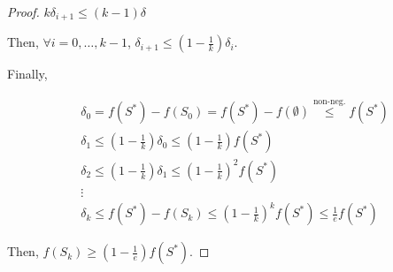 \begin{proof}
        $k \delta_{i+1} \leq (k-1) \delta$

        Then, $\forall i = 0, \dots, k-1$, $\delta_{i+1} \leq (1 - \frac{1}{k}) \delta_i$.

        Finally,

        \begin{equation*}
            \begin{split}
                &\delta_0 = f(S^*) - f(S_0) = f(S^*) - f(\emptyset) \overset{\text{non-neg.}}{\leq} f(S^*)\\
                & \delta_1 \leq (1 - \frac{1}{k}) \delta_0 \leq (1 - \frac{1}{k}) f(S^*)\\
                & \delta_2 \leq (1 - \frac{1}{k}) \delta_1 \leq (1 - \frac{1}{k})^2 f(S^*)\\
                & \vdots\\
                & \delta_k \leq f(S^*) - f(S_k) \leq (1 - \frac{1}{k})^k f(S^*) \leq \frac{1}{e} f(S^*) 
            \end{split}
        \end{equation*}

        Then, $f(S_k) \geq (1 - \frac{1}{e}) f(S^*)$.
    \end{proof}